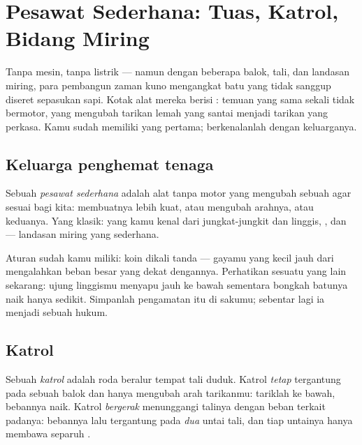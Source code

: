 \chapter{Pesawat Sederhana: Tuas, Katrol, Bidang Miring}\label{ch:g5:simple-machines}

Tanpa mesin, tanpa listrik --- namun dengan beberapa balok, tali, dan
landasan miring, para pembangun zaman kuno mengangkat batu yang tidak
sanggup diseret sepasukan sapi. Kotak alat mereka berisi \emph{}: temuan yang sama sekali tidak bermotor, yang mengubah
tarikan lemah yang santai menjadi tarikan yang perkasa. Kamu sudah
memiliki yang pertama; berkenalanlah dengan keluarganya.

\section{Keluarga penghemat tenaga}

\begin{definition}\label{def:g5:simple-machines:machine}
Sebuah \emph{pesawat sederhana} adalah alat
tanpa motor yang mengubah sebuah  agar sesuai bagi kita:
membuatnya lebih kuat, atau mengubah arahnya, atau keduanya. Yang
klasik: \emph{} yang kamu kenal dari jungkat-jungkit dan linggis,
\emph{}, dan \emph{} --- landasan miring yang
sederhana.
\end{definition}

\begin{example}\label{ex:g5:simple-machines:lever}
Aturan  sudah kamu miliki: koin dikali tanda --- gayamu yang kecil
jauh dari  mengalahkan beban besar yang dekat dengannya.
Perhatikan sesuatu yang lain sekarang: ujung linggismu menyapu jauh ke
bawah sementara bongkah batunya naik hanya sedikit. Simpanlah
pengamatan itu di sakumu; sebentar lagi ia menjadi sebuah hukum.
\end{example}

\section{Katrol}

\begin{definition}[Katrol]\label{def:g5:simple-machines:pulley}
Sebuah \emph{katrol} adalah roda beralur tempat tali
duduk. Katrol \emph{tetap} tergantung pada sebuah balok dan hanya
mengubah arah tarikanmu: tariklah ke bawah, bebannya naik. Katrol
\emph{bergerak} menunggangi talinya dengan beban terkait padanya:
bebannya lalu tergantung pada \emph{dua} untai tali, dan tiap untainya
hanya membawa separuh .
\end{definition}

